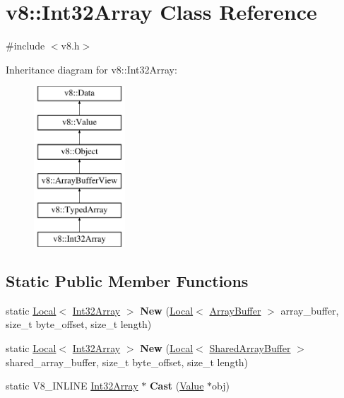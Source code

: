 \hypertarget{classv8_1_1Int32Array}{}\section{v8\+:\+:Int32\+Array Class Reference}
\label{classv8_1_1Int32Array}


{\ttfamily \#include $<$v8.\+h$>$}

Inheritance diagram for v8\+:\+:Int32\+Array\+:\begin{figure}[H]
\begin{center}
\leavevmode
\includegraphics[height=6.000000cm]{classv8_1_1Int32Array}
\end{center}
\end{figure}
\subsection*{Static Public Member Functions}
\begin{DoxyCompactItemize}
\item 
\mbox{\label{classv8_1_1Int32Array_a03adbd44725e3325d10bcc448e8bfd75}} 
static \mbox{\hyperlink{classv8_1_1Local}{Local}}$<$ \mbox{\hyperlink{classv8_1_1Int32Array}{Int32\+Array}} $>$ {\bfseries New} (\mbox{\hyperlink{classv8_1_1Local}{Local}}$<$ \mbox{\hyperlink{classv8_1_1ArrayBuffer}{Array\+Buffer}} $>$ array\+\_\+buffer, size\+\_\+t byte\+\_\+offset, size\+\_\+t length)
\item 
\mbox{\label{classv8_1_1Int32Array_acf112fc9df4e0bf2791be73264779905}} 
static \mbox{\hyperlink{classv8_1_1Local}{Local}}$<$ \mbox{\hyperlink{classv8_1_1Int32Array}{Int32\+Array}} $>$ {\bfseries New} (\mbox{\hyperlink{classv8_1_1Local}{Local}}$<$ \mbox{\hyperlink{classv8_1_1SharedArrayBuffer}{Shared\+Array\+Buffer}} $>$ shared\+\_\+array\+\_\+buffer, size\+\_\+t byte\+\_\+offset, size\+\_\+t length)
\item 
\mbox{\label{classv8_1_1Int32Array_afe7cdf534deadc3d872d8a43778809f1}} 
static V8\+\_\+\+I\+N\+L\+I\+NE \mbox{\hyperlink{classv8_1_1Int32Array}{Int32\+Array}} $\ast$ {\bfseries Cast} (\mbox{\hyperlink{classv8_1_1Value}{Value}} $\ast$obj)
\end{DoxyCompactItemize}
